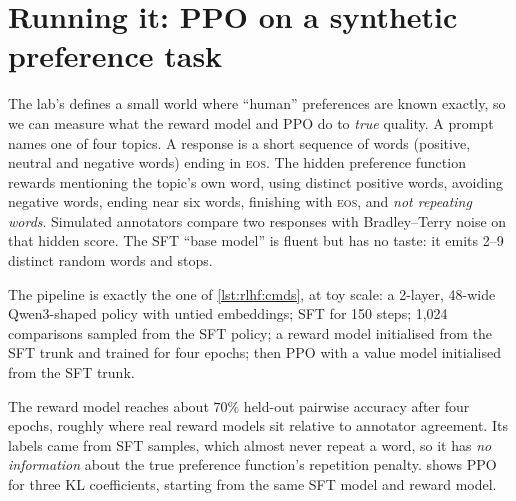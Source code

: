 \section{Running it: PPO on a synthetic preference task}\label{sec:rlhf:results}

The lab's  defines a small world where ``human'' preferences are known
exactly, so we can measure what the reward model and PPO do to \emph{true} quality. A prompt
names one of four topics. A response is a short sequence of words (positive, neutral and negative words)
ending in \textsc{eos}. The hidden preference function rewards mentioning the topic's own
word, using distinct positive words, avoiding negative words, ending near six words, finishing with
\textsc{eos}, and \emph{not repeating words}. Simulated annotators compare two responses with
Bradley--Terry noise on that hidden score. The SFT ``base model'' is fluent but has no taste: it emits
2--9 distinct random words and stops.

The pipeline is exactly the one of \cref{lst:rlhf:cmds}, at toy scale: a 2-layer, 48-wide
Qwen3-shaped policy with untied embeddings; SFT for 150 steps; 1,024 comparisons sampled from
the SFT policy; a reward model initialised from the SFT trunk and trained for four epochs; then
PPO with a value model initialised from the SFT trunk.

The reward model reaches about $70\%$ held-out pairwise accuracy after four epochs, roughly where
real reward models sit relative to annotator agreement. Its labels came from SFT samples, which almost
never repeat a word, so it has \emph{no information} about the true preference function's repetition
penalty.  shows PPO for three KL coefficients, starting from the same SFT model and
reward model.

